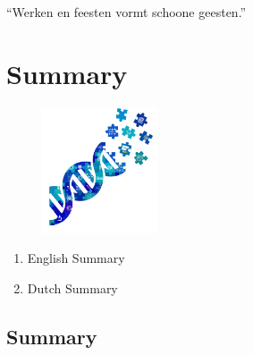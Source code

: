 \cleartorightpage
\begin{savequote}[75mm]
``Werken en feesten vormt schoone geesten.''
\end{savequote}

\chapter{Summary}\label{chapter:summary}
\setcounter{figure}{-1}
\setcounter{table}{-1}
\setcounter{section}{-1}
\setcounter{NAT@ctr}{-1}

\begin{figure}[t!]
\includegraphics[height=10em]{frontmatter/images/samenvatting.png}
\end{figure}

\begin{enumerate}[label=\color{emc-dark-blue}{\ref{chapter:summary}.\arabic*}]
\itemsep-0.5em
\setcounter{enumi}{-1}
\item English Summary
\item Dutch Summary
\end{enumerate}


\section{Summary}\label{section:summary-en}

